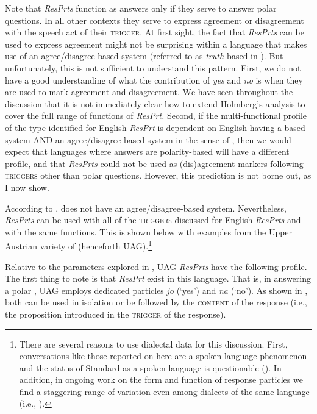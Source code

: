 \documentclass[output=paper]{LSP/langsci}
\begin{document}
Note that \textit{ResPrts} function as answers only if they serve to answer polar questions. In all other contexts they serve to express agreement or disagreement with the speech act of their \textsc{trigger.} At first sight, the fact that \textit{ResPrts} can be used to express agreement might not be surprising within a language that makes use of an agree/disagree-based system (referred to as \textit{truth-}based in \citealt{holmberg:15}). But unfortunately, this is not sufficient to understand this pattern. First, we do not have a good understanding of what the contribution of \textit{yes} and \textit{no} is when they are used to mark agreement and disagreement. \textsc{W}e have seen throughout the discussion that it is not immediately clear how to extend Holmberg’s analysis to cover the full range of functions of \textit{ResPrt.} Second, if the multi-functional profile of the type identified for English \textit{ResPrt} is dependent on English having a  based system AND an agree/disagree based system in the sense of \citet{Kuno1973}, then we would expect that languages where answers are polarity-based will have a different profile, and that \textit{ResPrts} could not be used as (dis)agreement markers following \textsc{triggers} other than polar questions. However, this prediction is not borne out, as I now show.

According to \citet[Section~4.2]{holmberg:15},  does not have an agree/disagree-based system. Nevertheless,  \textit{ResPrts} can be used with all of the \textsc{triggers} discussed for English \textit{ResPrts} and with the same functions. This is shown below with examples from the Upper Austrian variety of  (henceforth UAG).\footnote{There are several reasons to use dialectal data for this discussion. First, conversations like those reported on here are a spoken language phenomenon and the status of Standard  as a spoken language is questionable (\citealt{Weiß2004,Auer2004}). In addition, in ongoing work on the form and function of response particles we find a staggering range of variation even among dialects of the same language (i.e., ).}  

Relative to the parameters explored in \citet{holmberg:15}, UAG \textit{ResPrts} have the following profile.
The first thing to note is that \textit{ResPrt} exist in this language.
That is, in answering a polar , UAG employs dedicated particles \textit{jo} (‘yes’) and \textit{na} (‘no’). As shown in , both can be used in isolation or be followed by the \textsc{content} of the response (i.e., the proposition introduced in the \textsc{trigger} of the response). 
\end{document}
